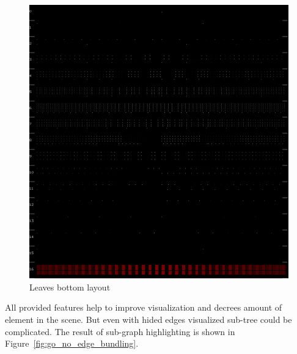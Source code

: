 \begin{figure}[h!]
\centering
\includegraphics[scale=0.3]{pictures/go_leaves_bottom_layout.png}
\caption{Leaves bottom layout}
\label{fig:go_leaves_bottom_layout}
\end{figure}

All provided features help to improve visualization and decrees amount of element in the scene. But even with hided edges visualized sub-tree could be complicated.
The result of sub-graph highlighting is shown in Figure~\ref{fig:go_no_edge_bundling}.

